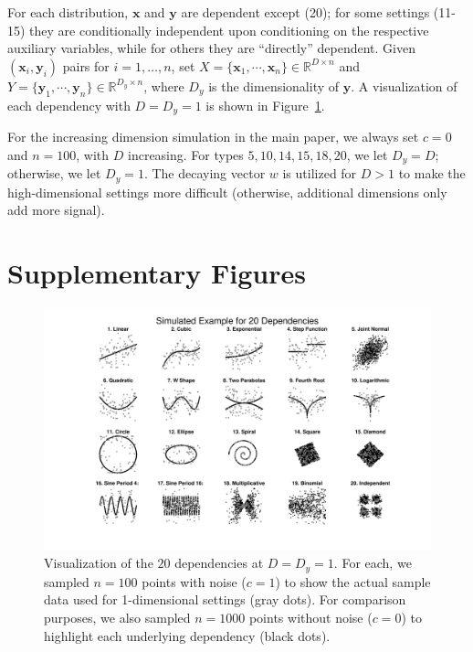 \documentclass[11pt]{article}
\providecommand{\mb}[1]{\boldsymbol{#1}}
\newcommand{\Real}{\mathbb{R}}
\newcommand{\mby}{\ensuremath{\mb{y}}}
\begin{document}
For each distribution, $\mb{x}$ and $\mb{y}$ are dependent except  (20); for some settings (11-15) they are conditionally independent upon conditioning on the respective auxiliary variables, while for others they are
 ``directly'' dependent. 
 Given $(\mb{x}_{i},\mb{y}_{i})$ pairs for $i=1,\ldots,n$, set $X=\{\mb{x}_{1},\cdots, \mb{x}_{n}\} \in \Real^{D \times n}$ and $Y=\{\mb{y}_{1},\cdots, \mb{y}_{n}\} \in \Real^{D_y \times n}$, where $D_y$ is the dimensionality of \mby. A visualization of each dependency with $D=D_y=1$ is shown in Figure~\ref{f:dependencies}.


For the increasing dimension simulation in the main paper, we always set $c=0$ and $n=100$, with $D$ increasing.  For types  $5,10,14,15,18,20$, we let $D_y=D$; otherwise, we let $D_y=1$. 
The decaying vector $w$ is utilized for $D>1$ to make the high-dimensional settings more difficult (otherwise, additional dimensions only add more signal).


\section{Supplementary Figures}
\label{appen:figs}





\begin{figure}[htbp]
\includegraphics[trim={5cm 0 3.5cm 0},clip, width=1.0\textwidth]{Figures/FigSimVisual}
\caption{Visualization of the $20$ dependencies at $D=D_{y}=1$. For each, we sampled $n=100$ points with noise ($c=1$) to show the actual sample data used for 1-dimensional settings (gray dots). For comparison purposes, we also sampled $n=1000$ points without noise ($c=0$) to highlight each underlying dependency (black dots).
}
\label{f:dependencies}
\end{figure}
\end{document}
